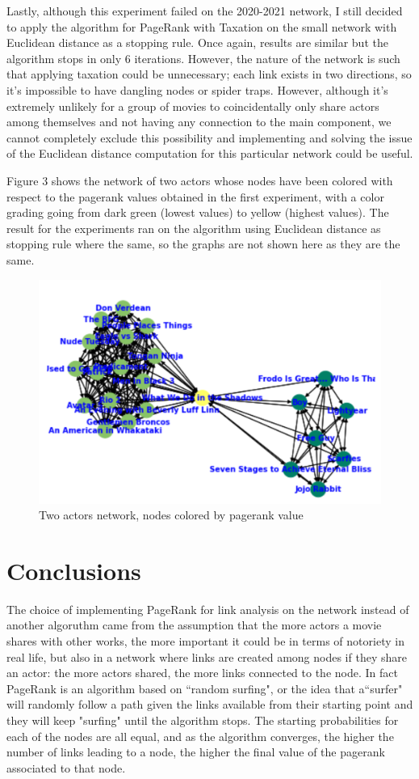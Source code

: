 \documentclass[11pt]{article}
\begin{document}
Lastly, although this experiment failed on the 2020-2021 network, I still decided to apply the algorithm for PageRank with Taxation on the small network with Euclidean distance as a stopping rule. Once again, results are similar but the algorithm stops in only 6 iterations. However, the nature of the network is such that applying taxation could be unnecessary; each link exists in two directions, so it's impossible to have dangling nodes or spider traps. However, although it's extremely unlikely for a group of movies to coincidentally only share actors among themselves and not having any connection to the main component, we cannot completely exclude this possibility and implementing and solving the issue of the Euclidean distance computation for this particular network could be useful. 

Figure 3 shows the network of two actors whose nodes have been colored with respect to the pagerank values obtained in the first experiment, with a color grading going from dark green (lowest values) to yellow (highest values). The result for the experiments ran on the algorithm using Euclidean distance as stopping rule where the same, so the graphs are not shown here as they are the same.

\begin{figure}[h!]
\centering
\includegraphics[height= 5 cm]{pagerankgraph.png}
\caption{Two actors network, nodes colored by pagerank value}
\label{fig:network3}
\end{figure}

\section{Conclusions}

The choice of implementing PageRank for link analysis on the network instead of another algoruthm came from the assumption that the more actors a movie shares with other works, the more important it could be in terms of notoriety in real life, but also in a network where links are created among nodes if they share an actor: the more actors shared, the more links connected to the node.
In fact PageRank is an algorithm based on ``random surfing", or the idea that a``surfer" will randomly follow a path given the links available from their starting point and they will keep "surfing" until the algorithm stops. The starting probabilities for each of the nodes are all equal, and as the algorithm converges, the higher the number of links leading to a node, the higher the final value of the pagerank associated to that node.
\end{document}
